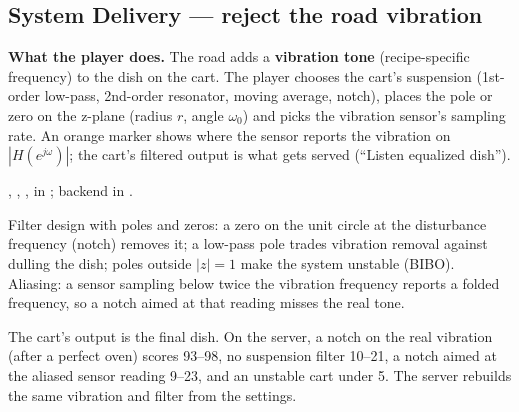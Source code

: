 \documentclass[11pt,a4paper]{article}
\begin{document}
\subsection{System Delivery --- reject the road vibration}
\textbf{What the player does.} The road adds a \textbf{vibration tone} (recipe-specific
frequency) to the dish on the cart. The player chooses the cart's suspension (1st-order
low-pass, 2nd-order resonator, moving average, notch), places the pole or zero on the
z-plane (radius $r$, angle $\omega_0$) and picks the vibration sensor's sampling rate. An
orange marker shows where the sensor reports the vibration on $|H(e^{j\omega})|$; the cart's
filtered output is what gets served (``Listen equalized dish'').
\begin{filesbox}
, ,
,  in ;
backend  in .
\end{filesbox}
\begin{conceptbox}
Filter design with poles and zeros: a zero on the unit circle at the disturbance
frequency (notch) removes it; a low-pass pole trades vibration removal against dulling
the dish; poles outside $|z|=1$ make the system unstable (BIBO). Aliasing: a sensor
sampling below twice the vibration frequency reports a folded frequency, so a notch aimed
at that reading misses the real tone.
\end{conceptbox}
\begin{impactbox}
The cart's output is the final dish. On the server, a notch on the real vibration (after a
perfect oven) scores 93--98, no suspension filter 10--21, a notch aimed at the aliased sensor
reading 9--23, and an unstable cart under 5. The server rebuilds the same vibration and
filter from the settings.
\end{impactbox}

\end{document}
